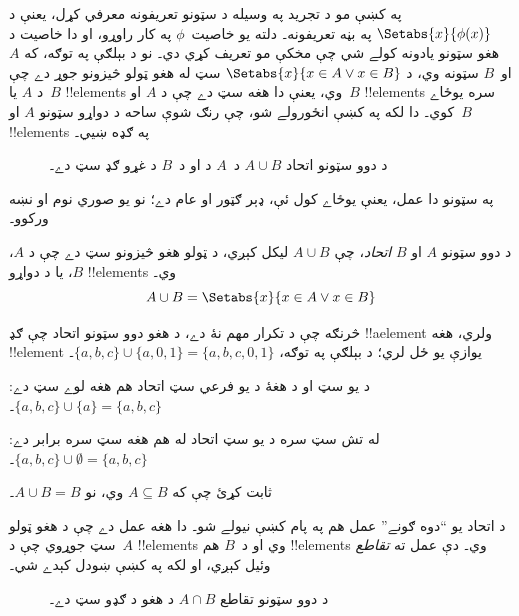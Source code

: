 \documentclass[../../../include/open-logic-section]{subfiles}
\begin{document}

\begin{explain}
په  کښې مو د تجريد په وسيله د سټونو تعريفونه معرفي کړل، يعنې د $\Setabs{x}{\phi(x)}$ په بڼه تعريفونه۔ دلته يو خاصيت~$\phi$ په کار راوړو، او دا خاصيت د هغو سټونو يادونه کولے شي چې مخکې مو تعريف کړي دي۔ نو د بېلګې په توګه، که $A$ او~$B$ سټونه وي، د $\Setabs{x}{x \in A \lor x \in B}$ سټ له هغو ټولو څيزونو جوړ دے چې د $A$ يا~$B$ !!{element}s وي، يعنې دا هغه سټ دے چې د $A$ او~$B$ !!{element}s سره يوځاے کوي۔ دا لکه په  کښې انځورولے شو، چې رنګ شوې ساحه د دواړو سټونو $A$ او~$B$ !!{element}s په ګډه ښيي۔

\begin{figure}
  \caption{د دوو سټونو اتحاد $A \cup B$ د~$A$ د  او د~$B$ د غړو ګډ سټ دے۔}
\end{figure}

په سټونو دا عمل، يعنې يوځاے کول ئې، ډېر ګټور او عام دے؛ نو يو صوري نوم او نښه ورکوو۔
\end{explain}

\begin{defn}[اتحاد]
د دوو سټونو $A$ او $B$ \emph{اتحاد}، چې $A \cup B$ ليکل کېږي، د ټولو هغو څيزونو سټ دے چې د $A$، $B$، يا د دواړو !!{element}s وي۔
\[
A \cup B = \Setabs{x}{x \in A \lor x \in B}
\]
\end{defn}

\begin{ex}
څرنګه چې د  تکرار مهم نۀ دے، د هغو دوو سټونو اتحاد چې ګډ !!a{element} ولري، هغه !!{element} يوازې يو ځل لري؛ د بېلګې په توګه، $\{ a, b, c\} \cup \{ a, 0, 1\} = \{a, b, c, 0, 1\}$۔

د يو سټ او د هغۀ د يو فرعي سټ اتحاد هم هغه لوے سټ دے: $\{a, b, c \} \cup \{a \} = \{a, b, c\}$۔

له تش سټ سره د يو سټ اتحاد له هم هغه سټ سره برابر دے: $\{a, b, c \} \cup \emptyset = \{a, b, c \}$۔
\end{ex}

\begin{prob}
ثابت کړئ چې که $A \subseteq B$ وي، نو $A \cup B = B$۔
\end{prob}

\begin{explain}
د اتحاد يو ``دوه ګونے'' عمل هم په پام کښې نيولے شو۔ دا هغه عمل دے چې د هغو ټولو  سټ جوړوي چې د~$A$ !!{element}s وي او د~$B$ هم !!{element}s وي۔ دې عمل ته \emph{تقاطع} وئيل کېږي، او لکه په  کښې ښودل کېدے شي۔
\begin{figure}
  \caption{د دوو سټونو تقاطع $A \cap B$ د هغو د ګډو  سټ دے۔}
\end{figure}
\end{explain}
\end{document}
